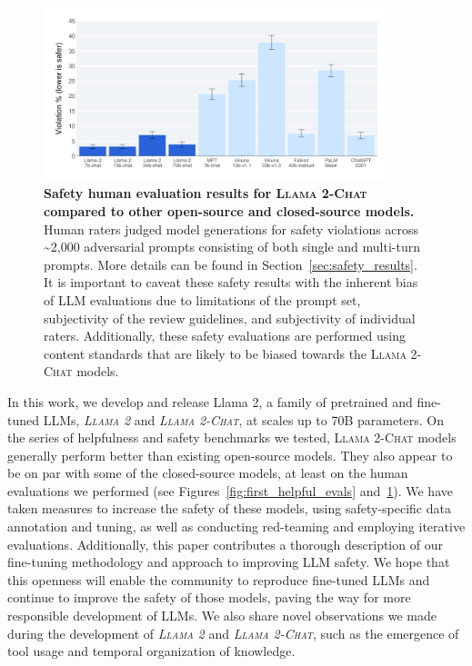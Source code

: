 \documentclass{article}
\newcommand{\modelname}{\textsc{Llama 2-Chat}\xspace}
\newcommand{\cinnamon}{\textsc{Llama 2}\xspace}
\begin{document}
\begin{figure}[t]
    \centering
    \includegraphics[width=0.9\textwidth]{img/safety_overall_human_temp.png}
    \caption{\textbf{Safety human evaluation results for \modelname compared to other open-source and closed-source models.} Human raters judged model generations for safety violations across \textasciitilde2,000 adversarial prompts consisting of both single and multi-turn prompts. More details can be found in Section~\ref{sec:safety_results}. It is important to caveat these safety results with the inherent bias of LLM evaluations due to limitations of the prompt set, subjectivity of the review guidelines, and subjectivity of individual raters. Additionally, these safety evaluations are performed using content standards that are likely to be biased towards the \modelname models.}
    \label{fig:first_safety_evals}
\end{figure}

In this work, we develop and release Llama 2, a family of pretrained and fine-tuned LLMs, \textit{\cinnamon} and \textit{\modelname}, at scales up to 70B parameters. On the series of helpfulness and safety benchmarks we tested, \modelname models generally perform better than existing open-source models. They also appear to be on par with some of the closed-source models, at least on the human evaluations we performed (see Figures~\ref{fig:first_helpful_evals} and~\ref{fig:first_safety_evals}). We have taken measures to increase the safety of these models, using safety-specific data annotation and tuning, as well as conducting red-teaming and employing iterative evaluations. Additionally, this paper contributes a thorough description of our fine-tuning methodology and approach to improving LLM safety. We hope that this openness will enable the community to reproduce fine-tuned LLMs and continue to improve the safety of those models, paving the way for more responsible development of LLMs. We also share novel observations we made during the development of \textit{\cinnamon} and \textit{\modelname}, such as the emergence of tool usage and temporal organization of knowledge.
\end{document}
